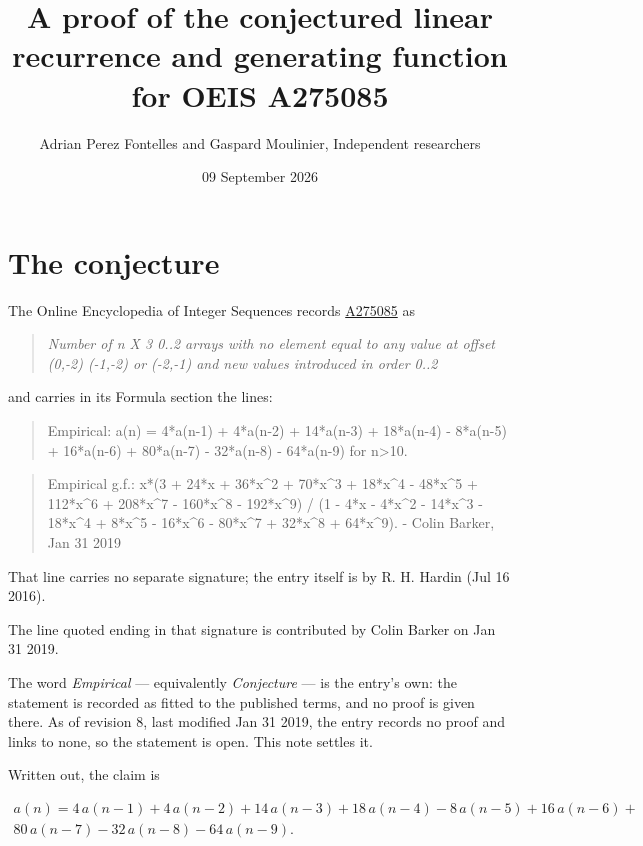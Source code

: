 \documentclass[11pt]{article}
\title{A proof of the conjectured linear recurrence and generating function for OEIS A275085}
\author{Adrian Perez Fontelles and Gaspard Moulinier, Independent researchers}
\date{09 September 2026}
\theoremstyle{definition}
\begin{document}
\maketitle
\section{The conjecture}

The Online Encyclopedia of Integer Sequences records \href{https://oeis.org/A275085}{A275085} as

\begin{quote}\itshape Number of n X 3 0..2 arrays with no element equal to any value at offset (0,-2) (-1,-2) or (-2,-1) and new values introduced in order 0..2\end{quote}

and carries in its Formula section the lines:

\begin{quote}\ttfamily Empirical: a(n) = 4*a(n-1) + 4*a(n-2) + 14*a(n-3) + 18*a(n-4) - 8*a(n-5) + 16*a(n-6) + 80*a(n-7) - 32*a(n-8) - 64*a(n-9) for n>10.\end{quote}

\begin{quote}\ttfamily Empirical g.f.: x*(3 + 24*x + 36*x\textasciicircum{}2 + 70*x\textasciicircum{}3 + 18*x\textasciicircum{}4 - 48*x\textasciicircum{}5 + 112*x\textasciicircum{}6 + 208*x\textasciicircum{}7 - 160*x\textasciicircum{}8 - 192*x\textasciicircum{}9) / (1 - 4*x - 4*x\textasciicircum{}2 - 14*x\textasciicircum{}3 - 18*x\textasciicircum{}4 + 8*x\textasciicircum{}5 - 16*x\textasciicircum{}6 - 80*x\textasciicircum{}7 + 32*x\textasciicircum{}8 + 64*x\textasciicircum{}9). - Colin Barker, Jan 31 2019\end{quote}

That line carries no separate signature; the entry itself is by R. H. Hardin (Jul 16 2016).

The line quoted ending in that signature is contributed by Colin Barker on Jan 31 2019.

The word {\itshape Empirical} --- equivalently {\itshape Conjecture} --- is the entry's own: the statement is recorded as fitted to the published terms, and no proof is given there. As of revision 8, last modified Jan 31 2019, the entry records no proof and links to none, so the statement is open. This note settles it.

Written out, the claim is

\begin{multline*} a(n) = 4\,a(n-1) + 4\,a(n-2) + 14\,a(n-3) + 18\,a(n-4) - 8\,a(n-5) + 16\,a(n-6) + \\ 80\,a(n-7) - 32\,a(n-8) - 64\,a(n-9). \end{multline*}
\end{document}
